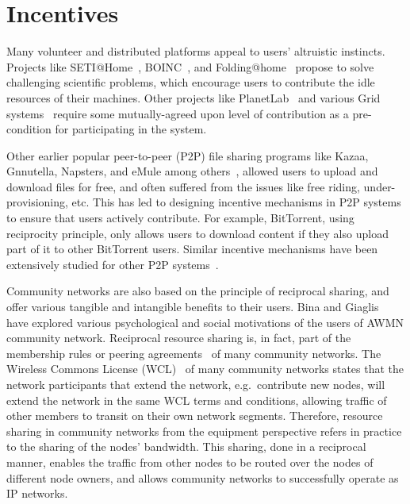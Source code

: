 

\section{Incentives}
\label{sec__incentives_related_work}

Many volunteer and distributed platforms appeal to users' altruistic instincts. 
Projects like 
	SETI@Home~\cite{Anderson2002}, 
	BOINC~\cite{Anderson2004}, and
	Folding@home~\cite{Beberg2009}
propose to solve challenging scientific problems, which encourage users to contribute the idle resources of their machines.
Other projects like PlanetLab~\cite{Chun2003} and various Grid systems~\cite{Foster2003} require
some mutually-agreed upon level of contribution as a pre-condition for participating in the system.

Other earlier popular peer-to-peer (P2P) file sharing programs like Kazaa, Gnnutella, Napsters, and eMule among others~\cite{Rodrigues2010}, 
allowed users to upload and download files for free, %
and often suffered from the issues like free riding, under-provisioning, etc. 
This has led to designing incentive mechanisms in P2P systems to ensure that users actively contribute. 
For example, BitTorrent, using reciprocity principle, only allows users to download content
if they also upload part of it to other BitTorrent users. 
Similar incentive mechanisms have been extensively studied for other P2P systems~\cite{Babaioff2007, Shen2010, Zhang2010}.

Community networks are also based on the principle of reciprocal sharing, 
and offer various tangible and intangible benefits to their users.
Bina and Giaglis~\cite{Bina2006} have explored various psychological and 
social motivations of the users of AWMN community network. 
Reciprocal resource sharing is, in fact, part of the membership rules 
or peering agreements~\cite{PicoPeering2005} of many community networks. 
The Wireless Commons License (WCL)~\cite{WCL2010} of many community networks states 
that the network participants that extend the network, e.g.~contribute new nodes, 
will extend the network in the same WCL terms and conditions, 
allowing traffic of other members to transit on their own network segments. 
Therefore, resource sharing in community networks from the equipment perspective 
refers in practice to the sharing of the nodes' bandwidth. 
This sharing, done in a reciprocal manner, enables the traffic from other nodes 
to be routed over the nodes of different node owners, and 
allows community networks to successfully operate as IP networks.


